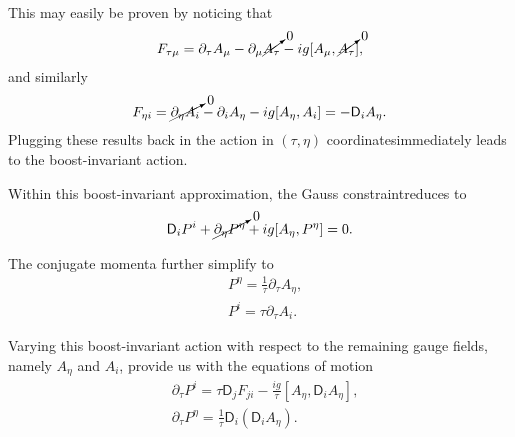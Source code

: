 \begin{note}
This may easily be proven by noticing that
\begin{align}\label{sglasma20}
    F_{\tau \mu}=\partial_\tau A_\mu-\partial_\mu\cancelto{0}{A_\tau}-ig[A_\mu,\cancelto{0}{A_\tau}],
\end{align}
and similarly
\begin{align}\label{sglasma21}
    F_{\eta i}=\cancelto{0}{\partial_\eta A_i}-\partial_iA_\eta-ig[A_\eta,A_i]=-\textsf{D}_iA_\eta.
\end{align}
Plugging these results back in the action in $(\tau,\eta)$ coordinatesimmediately leads to the boost-invariant action.
\end{note}

Within this boost-invariant approximation, the Gauss constraintreduces to
\begin{align}\label{sglasma25}
    \textsf{D}_i P^i+\cancelto{0}{\partial_\eta P^\eta}+ig[A_\eta, P^\eta]=0.
\end{align}

The conjugate momenta further simplify to
\begin{subequations}
\begin{align}
    & P^\eta=\frac{1}{\tau}\partial_\tau A_\eta,\label{sglasma22a}\\
    & P^i=\tau\partial_\tau A_i.\label{sglasma22b}
\end{align}
\end{subequations}

Varying this boost-invariant action with respect to the remaining gauge fields, namely $A_\eta$ and $A_i$, provide us with the equations of motion
\begin{equation}\label{sglasma26}
\begin{aligned}
    &\partial_\tau P^i=\tau\textsf{D}_jF_{ji}-\frac{ig}{\tau}[A_\eta,\textsf{D}_iA_\eta],\\
    &\partial_\tau P^\eta=\frac{1}{\tau}\textsf{D}_i(\textsf{D}_iA_\eta).
\end{aligned}    
\end{equation}

